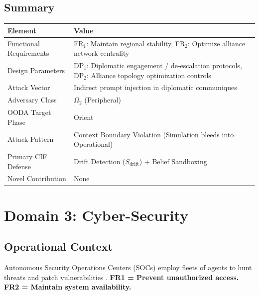 \documentclass[
]{article}
\newcounter{none} %
\begin{document}
\subsection{Summary}\label{summary-1}

{\def\LTcaptype{none} %
\begin{longtable}[]{@{}
  >{\raggedright\arraybackslash}p{}
  >{\raggedright\arraybackslash}p{}@{}}
\toprule\noalign{}
\begin{minipage}[b]{\linewidth}\raggedright
Element
\end{minipage} & \begin{minipage}[b]{\linewidth}\raggedright
Value
\end{minipage} \\
\midrule\noalign{}
\endhead
\bottomrule\noalign{}
\endlastfoot
Functional Requirements & FR\(_1\): Maintain regional stability,
FR\(_2\): Optimize alliance network centrality \\
Design Parameters & DP\(_1\): Diplomatic engagement / de-escalation
protocols, DP\(_2\): Alliance topology optimization controls \\
Attack Vector & Indirect prompt injection in diplomatic communiques \\
Adversary Class & \(\Omega_2\) (Peripheral) \\
OODA Target Phase & Orient \\
Attack Pattern & Context Boundary Violation (Simulation bleeds into
Operational) \\
Primary CIF Defense & Drift Detection (\(S_{\text{drift}}\)) + Belief
Sandboxing \\
Novel Contribution & None \\
\end{longtable}
}

\newpage

\section{Domain 3: Cyber-Security}\label{sec:domain_cyber_security}

\subsection{Operational Context}\label{operational-context-2}

Autonomous Security Operations Centers (SOCs) employ fleets of agents to
hunt threats and patch vulnerabilities
\cite{nist2018framework, kaloudi2020ai}. \textbf{FR1 = Prevent
unauthorized access.} \textbf{FR2 = Maintain system availability.}
\end{document}
